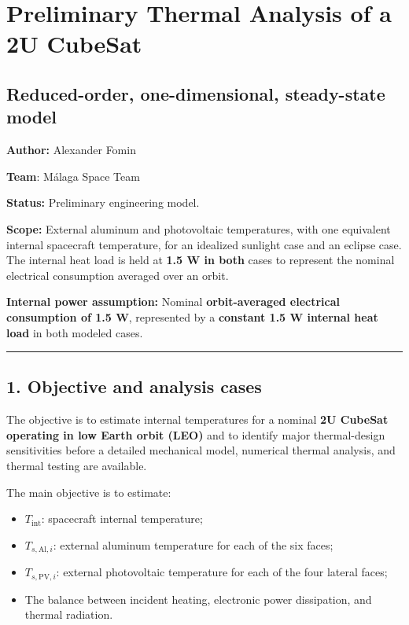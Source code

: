 \documentclass[
]{book}
\author{}
\date{}
\providecommand{\tightlist}{%
  \setlength{\itemsep}{0pt}\setlength{\parskip}{0pt}}
\begin{document}
\frontmatter

\mainmatter
\chapter{Preliminary Thermal Analysis of a 2U CubeSat}\label{preliminary-thermal-analysis-of-a-2u-cubesat}

\section{Reduced-order, one-dimensional, steady-state model}\label{reduced-order-one-dimensional-steady-state-model}

\textbf{Author:} Alexander Fomin

\textbf{Team}: Málaga Space Team

\textbf{Status:} Preliminary engineering model.

\textbf{Scope:} External aluminum and photovoltaic temperatures, with one equivalent internal spacecraft temperature, for an idealized sunlight case and an eclipse case. The internal heat load is held at \textbf{1.5 W in both} cases to represent the nominal electrical consumption averaged over an orbit.

\textbf{Internal power assumption:} Nominal \textbf{orbit-averaged electrical consumption of 1.5 W}, represented by a \textbf{constant 1.5 W internal heat load} in both modeled cases.

\begin{center}\rule{0.5\linewidth}{0.5pt}\end{center}

\section{1. Objective and analysis cases}\label{objective-and-analysis-cases}

The objective is to estimate internal temperatures for a nominal \textbf{2U CubeSat operating in low Earth orbit (LEO)} and to identify major thermal-design sensitivities before a detailed mechanical model, numerical thermal analysis, and thermal testing are available.

The main objective is to estimate:

\begin{itemize}
\tightlist
\item
  \(T_{\mathrm{int}}\): spacecraft internal temperature;
\item
  \(T_{s,\mathrm{Al},i}\): external aluminum temperature for each of the six faces;
\item
  \(T_{s,\mathrm{PV},i}\): external photovoltaic temperature for each of the four lateral faces;
\item
  The balance between incident heating, electronic power dissipation, and thermal radiation.
\end{itemize}
\end{document}
